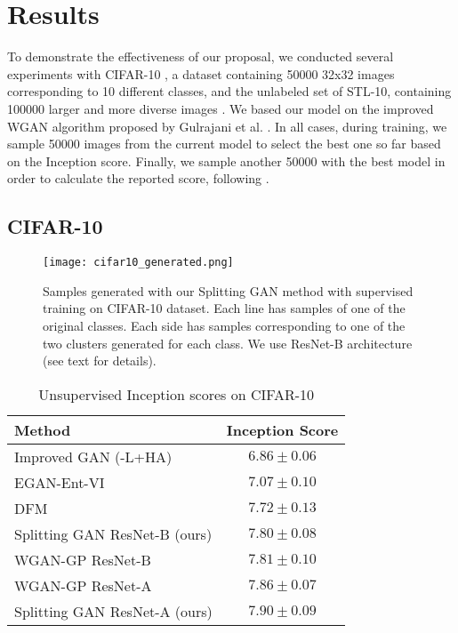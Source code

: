 \documentclass[times,twocolumn]{article}
\begin{document}
\section{Results}\label{sec:results}
To demonstrate the effectiveness of our proposal, we conducted several experiments with CIFAR-10 \cite{Krizhevsky2009}, a dataset containing 50000 32x32 images corresponding to 10 different classes, and the unlabeled set of STL-10, containing 100000 larger and more diverse images \cite{Coates2011}. We based our model on the improved WGAN algorithm proposed by Gulrajani et al. \cite{Gulrajani2017,Gulrajani2017github}. In all cases, during training, we sample 50000 images from the current model to select the best one so far based on the Inception score. Finally, we sample another 50000 with the best model in order to calculate the reported score, following \cite{Odena2017}.

\subsection{CIFAR-10}

\begin{figure*}
\centering
\texttt{[image: cifar10\_generated.png]}
\caption{Samples generated with our Splitting GAN method with supervised training on CIFAR-10 dataset. Each line has samples of one of the original classes. Each side has samples corresponding to one of the two clusters generated for each class. We use ResNet-B architecture (see text for details).}
\label{fig:cifar10_generated}
\end{figure*}

\begin{table}
\begin{center}
\caption{Unsupervised Inception scores on CIFAR-10}
\begin{tabular}{lc}
\toprule
Method                                    &   Inception Score \\
\midrule
Improved GAN (-L+HA) \cite{Salimans2016} &   $6.86 \pm 0.06$ \\
EGAN-Ent-VI \cite{Dai2017}               &   $7.07 \pm 0.10$ \\
DFM \cite{WardeFarley2017}               &   $7.72 \pm 0.13$ \\
Splitting GAN ResNet-B (ours)              &   $7.80 \pm 0.08$ \\
WGAN-GP ResNet-B                         &   $7.81 \pm 0.10$ \\
WGAN-GP ResNet-A \cite{Gulrajani2017}    &   $7.86 \pm 0.07$ \\
Splitting GAN ResNet-A (ours)              &   $\bm{7.90 \pm 0.09}$ \\
\bottomrule
\end{tabular}
\end{center}
\label{tab:unsup}
\end{table}
\end{document}
